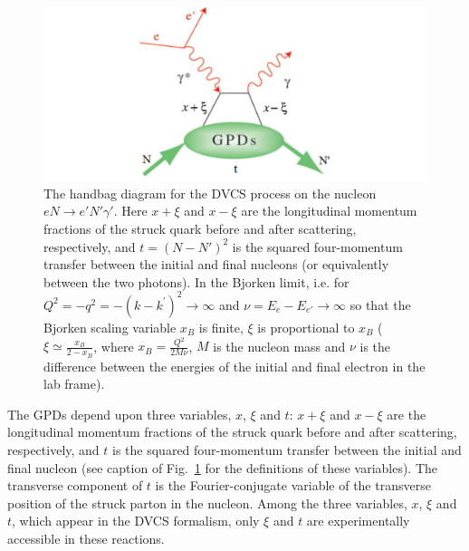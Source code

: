 \begin{figure}[h]
\begin{center}
\includegraphics[scale=0.6]{handbag.pdf}
\caption[Handbag diagram for the DVCS process] {The handbag diagram for the DVCS process on the nucleon $eN\to e'N'\gamma'$. 
Here $x+\xi$ and $x-\xi$ are the longitudinal momentum fractions of the 
struck quark before and after scattering, respectively, and $t=(N-N')^2$ is the squared four-momentum transfer between the initial and final nucleons (or equivalently between the two photons).  In the Bjorken limit, i.e. for $Q^2=-q^2=-(k-k^\prime)^2\to \infty$ and $\nu = E_e-E_{e'} \to \infty$ so that the Bjorken scaling variable $x_B$ is finite, $\xi$ is proportional to $x_B$ ($\xi\simeq\frac{x_B}{2-x_B}$, where $x_B=\frac{Q^2}{2M\nu}$, $M$ is the nucleon mass and $\nu$ is the difference between the energies of the initial and final electron in the lab frame).}
\label{fig:dvcs}
\end{center}
\end{figure}

The GPDs depend upon three variables, $x$, $\xi$ and $t$: $x+\xi$ and $x-\xi$ are the longitudinal momentum fractions of the struck quark before and after scattering, respectively, and $t$ is the squared four-momentum transfer between the initial and final nucleon (see caption of Fig.~\ref{fig:dvcs} for the definitions of these variables). The transverse component of $t$ is the Fourier-conjugate variable of the transverse position of the struck parton in the nucleon. Among the three variables, $x$, $\xi$ and $t$, which appear in the DVCS formalism, only $\xi$ and $t$ are experimentally accessible in these reactions. 

